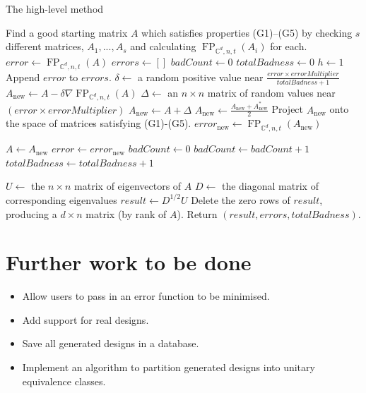 \documentclass{article}
\newcommand{\C}{\mathbb{C}}
\DeclareMathOperator{\FP}{FP}
\theoremstyle{definition}
\begin{document}
  \begin{algorithm}
    \caption{The high-level method}\label{alg:high_level}
    \begin{algorithmic}[1]
        \State Find a good starting matrix $ A $ which satisfies properties (G1)--(G5) by checking $ s $ different
               matrices, $ A_1,...,A_s $ and calculating $\FP_{\C^d,n,t}(A_i)$ for each. \label{line:seed}
        \State $ error \gets \FP_{\C^d,n,t}(A) $
        \State $ errors \gets [] $
        \State $ badCount \gets 0 $
        \State $ totalBadness \gets 0 $
        \State $ h \gets 1 $
         \label{line:tf_iter}
          \State Append $ error $ to $ errors $.
            \State $ \delta \gets $ a random positive value near $ \frac{error \times errorMultiplier}{totalBadness + 1} $
            \State $ A_{\mathrm{new}} \gets A - \delta \nabla\FP_{\C^d,n,t}(A) $
          \Else
            \State $ \Delta \gets $ an $ n \times n $ matrix of random values near $ (error \times errorMultiplier) $
            \State $ A_{\mathrm{new}} \gets A + \Delta $
          \EndIf
          \State $ A_{\mathrm{new}} \gets \frac{A_{\mathrm{new}} + A_{\mathrm{new}}^*}{2} $\label{line:make_hermitian}
          \State Project $ A_{\mathrm{new}} $ onto the space of matrices satisfying (G1)-(G5).
          \State $ error_\mathrm{new} \gets \FP_{\C^d,n,t}(A_{\mathrm{new}}) $

            \State $ A \gets A_\mathrm{new} $
            \State $ error \gets error_\mathrm{new} $
            \State $ badCount \gets 0 $
          \Else
            \State $ badCount \gets badCount + 1 $
            \State $ totalBadness \gets totalBadness + 1 $
          \EndIf
        \EndWhile

        \State $ U \gets $ the $ n \times n $ matrix of eigenvectors of $ A $
        \State $ D \gets $ the diagonal matrix of corresponding eigenvalues
        \State $ result \gets D^{1/2}U $
        \State Delete the zero rows of $ result $, producing a $ d \times n $ matrix (by rank of $ A $).
        \State Return $ (result, errors, totalBadness) $.
      \EndProcedure
    \end{algorithmic}
  \end{algorithm}

  \section{Further work to be done}
  \begin{itemize}
    \item Allow users to pass in an error function to be minimised.
    \item Add support for real designs.
    \item Save all generated designs in a database.
    \item Implement an algorithm to partition generated designs into unitary equivalence classes.
  \end{itemize}

  \printbibliography
\end{document}
